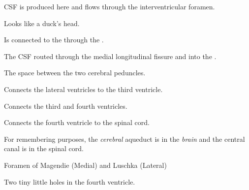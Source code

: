\begin{coloredlist}
    \item {}
    \begin{coloredlist}
        \item CSF is produced here and flows through the interventricular foramen.
    \end{coloredlist}
    \item {}
    \begin{coloredlist}
        \item Looks like a duck's head.
        \item Is connected to the  through the .
    \end{coloredlist}
    \item The CSF routed through the medial longitudinal fissure and into the .
    \item {}
    \begin{coloredlist}
        \item The space between the two cerebral peduncles.
    \end{coloredlist}
    \item {}
    \begin{coloredlist}
        \item Connects the lateral ventricles to the third ventricle.
    \end{coloredlist}
    \item {}
    \begin{coloredlist}
        \item Connects the third and fourth ventricles.
    \end{coloredlist}
    \item {}
    \begin{coloredlist}
        \item Connects the fourth ventricle to the spinal cord.
        \item For remembering purposes, the \textit{cerebral} aqueduct is in the \textit{brain} and the central canal is in the spinal cord.
    \end{coloredlist}
    \item {}
    \begin{coloredlist}
        \item Foramen of Magendie (Medial) and Luschka (Lateral)
        \begin{coloredlist}
            \item Two tiny little holes in the fourth ventricle.
        \end{coloredlist}
    \end{coloredlist}
\end{coloredlist}

